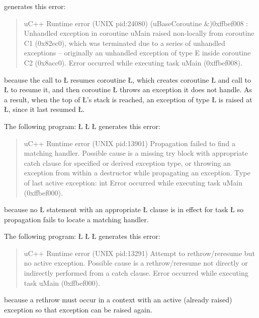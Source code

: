 \documentclass[openright,twoside]{report}
\begin{document}
generates this error:
\begin{quote}
\BGfont
uC++ Runtime error (UNIX pid:24080) (uBaseCoroutine \&)0xffbef008 : Unhandled exception in coroutine uMain raised non-locally from coroutine C1 (0x82ec0), which was terminated due to a series of unhandled exceptions -- originally an unhandled exception of type E inside coroutine C2 (0x8acc0).
Error occurred while executing task uMain (0xffbef008).
\end{quote}
because the call to \LGinlinetrue\LGbegin\lgrinde\L{}\endlgrinde\LGend{} resumes coroutine \LGinlinetrue\LGbegin\lgrinde\L{}\endlgrinde\LGend{}, which creates coroutine \LGinlinetrue\LGbegin\lgrinde\L{}\endlgrinde\LGend{} and call to \LGinlinetrue\LGbegin\lgrinde\L{}\endlgrinde\LGend{} to resume it, and then coroutine \LGinlinetrue\LGbegin\lgrinde\L{}\endlgrinde\LGend{} throws an exception it does not handle.
As a result, when the top of \LGinlinetrue\LGbegin\lgrinde\L{}\endlgrinde\LGend{}'s stack is reached, an exception of type \LGinlinetrue\LGbegin\lgrinde\L{}\endlgrinde\LGend{} is raised at \LGinlinetrue\LGbegin\lgrinde\L{}\endlgrinde\LGend{}, since it last resumed \LGinlinetrue\LGbegin\lgrinde\L{}\endlgrinde\LGend{}.

The following program:
\LGinlinefalse\LGbegin\lgrinde
\L{}
\L{\LB{}}
\L{\LB{\}}}
\endlgrinde\LGend
generates this error:
\begin{quote}
\BGfont
uC++ Runtime error (UNIX pid:13901) Propagation failed to find a matching handler.
Possible cause is a missing try block with appropriate catch clause for specified or derived exception type,
or throwing an exception from within a destructor while propagating an exception.
Type of last active exception: int
Error occurred while executing task uMain (0xffbef000).
\end{quote}
because no \LGinlinetrue\LGbegin\lgrinde\L{}\endlgrinde\LGend{} statement with an appropriate \LGinlinetrue\LGbegin\lgrinde\L{}\endlgrinde\LGend{} clause is in effect for task \LGinlinetrue\LGbegin\lgrinde\L{}\endlgrinde\LGend{} so propagation fails to locate a matching handler.

The following program:
\LGinlinefalse\LGbegin\lgrinde
\L{}
\L{\LB{}}
\CE{}\L{\LB{\}}}
\endlgrinde\LGend
generates this error:
\begin{quote}
\BGfont
uC++ Runtime error (UNIX pid:13291) Attempt to rethrow/reresume but no active exception.
Possible cause is a rethrow/reresume not directly or indirectly performed from a catch clause.
Error occurred while executing task uMain (0xffbef000).
\end{quote}
because a rethrow must occur in a context with an active (already raised) exception so that exception can be raised again.
\end{document}
